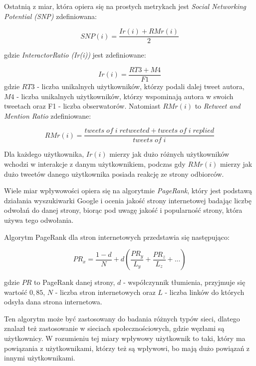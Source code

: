 \documentclass[polish,12pt]{aghthesis}
\begin{document}
Ostatnią z miar, która opiera się na prostych metrykach jest \textit{Social Networking Potential (SNP)} zdefiniowana:

\begin{equation}
    SNP(i) = \frac{Ir(i) + RMr(i)}{2} \label{n10}
\end{equation}

gdzie \textit{InteractorRatio (Ir(i))} jest zdefiniowane:

\begin{equation}
    Ir(i) = \frac{RT3 + M4}{F1} \label{n11}
\end{equation}
gdzie $RT3$ - liczba unikalnych użytkowników, którzy podali dalej tweet autora, $M4$ - liczba unikalnych użytkowników, którzy wspominają autora w swoich tweetach oraz F1 - liczba obserwatorów. Natomiast $RMr(i)$ to \textit{Retweet and Mention Ratio} zdefiniowane:

\begin{equation}
    RMr(i) = \frac{tweets\; of\; i\; retweeted + tweets\; of\; i\; replied}{tweets\; of\; i} \label{n12}
\end{equation}


Dla każdego użytkownika, $Ir(i)$ mierzy jak dużo różnych użytkowników wchodzi w interakcje z danym użytkownikiem, podczas gdy $RMr(i)$ mierzy jak dużo tweetów danego użytkownika posiada reakcję ze strony odbiorców.

\vspace{5mm}

Wiele miar wpływowości opiera się na algorytmie \textit{PageRank}\cite{pagerank}, który jest podstawą działania wyszukiwarki Google i ocenia jakość strony internetowej badając liczbę odwołań do danej strony, biorąc pod uwagę jakość i popularność strony, która używa tego odwołania. 

Algorytm PageRank dla stron internetowych przedstawia się następująco:

\begin{equation}
    PR_x = \frac{1 - d}{N} + d \left( \frac{PR_y}{L_y} + \frac{PR_z}{L_z} + ...\right) \label{n13}
\end{equation}

gdzie $PR$ to PageRank danej strony, $d$ - współczynnik tłumienia, przyjmuje się wartość $0,85$, $N$ - liczba stron internetowych oraz $L$ - liczba linków do których odsyła dana strona internetowa.

Ten algorytm może być zastosowany do badania różnych typów sieci, dlatego znalazł też zastosowanie w sieciach społecznościowych, gdzie węzłami są użytkownicy. W rozumieniu tej miary wpływowy użytkownik to taki, który ma powiązania z użytkownikami, którzy też są wpływowi, bo mają dużo powiązań z innymi użytkownikami. 
\end{document}
